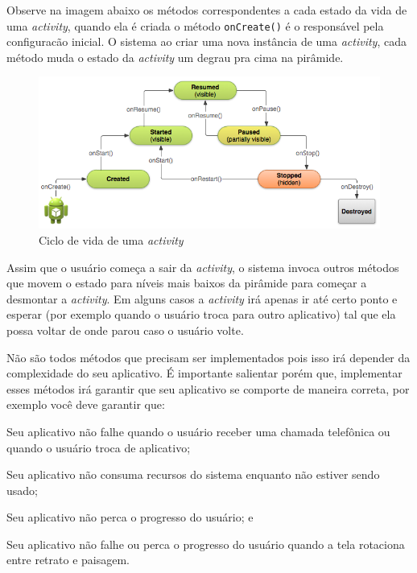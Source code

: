 \documentclass[a4paper,12pt,brazil,doubleside]{book}
\begin{document}
\begin{singlespace}
Observe na imagem abaixo os métodos correspondentes a cada estado da vida de uma \emph{activity}, quando ela é criada o método \texttt{onCreate()} é o responsável pela configuracão inicial. O sistema ao criar uma nova instância de uma \emph{activity}, cada método muda o estado da \emph{activity} um degrau pra cima na pirâmide. 

\begin{figure}[H]
  \centering
  \includegraphics[width=1\textwidth]{figuras/design/basic-lifecycle.png}
  \caption{Ciclo de vida de uma \emph{activity} }
  \label{fig:e}
\end{figure}

Assim que o usuário começa a sair da \emph{activity}, o sistema invoca outros métodos que movem o estado para níveis mais baixos da pirâmide para começar a desmontar a \emph{activity}. Em alguns casos a \emph{activity} irá apenas ir até certo ponto e esperar (por exemplo quando o usuário troca para outro aplicativo) tal que ela possa voltar de onde parou caso o usuário volte. 

 Não são todos métodos que precisam ser implementados pois isso irá depender da complexidade do seu aplicativo. É importante salientar porém que, implementar esses métodos irá garantir que seu aplicativo se comporte de maneira correta, por exemplo você deve garantir que:
 \bi
 \item Seu aplicativo não falhe quando o usuário receber uma chamada telefônica ou quando o usuário troca de aplicativo;
 \item Seu aplicativo não consuma recursos do sistema enquanto não estiver sendo usado;
 \item Seu aplicativo não perca o progresso do usuário; e
 \item Seu aplicativo não falhe ou perca o progresso do usuário quando a tela rotaciona entre retrato e paisagem.
\ei


\end{singlespace}
\end{document}
